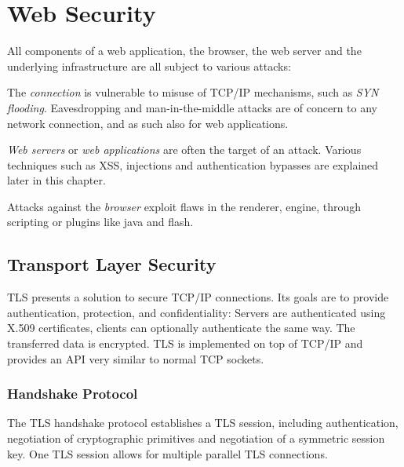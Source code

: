 \chapter{Web Security}
All components of a web application, the browser, the web server and the
underlying infrastructure are all subject to various attacks:

The \emph{connection} is vulnerable to misuse of TCP/IP mechanisms, such as
\textit{SYN flooding}. Eavesdropping and man-in-the-middle attacks are of
concern to any network connection, and as such also for web applications.

\emph{Web servers} or \emph{web applications} are often the target of an attack.
Various techniques such as XSS, injections and authentication bypasses are
explained later in this chapter.

Attacks against the \emph{browser} exploit flaws in the renderer, engine,
through scripting or plugins like java and flash.

\section{Transport Layer Security}
TLS presents a solution to secure TCP/IP connections. Its goals are to provide
authentication, protection, and confidentiality: Servers are authenticated using
X.509 certificates, clients can optionally authenticate the same way. The
transferred data is encrypted. TLS is implemented on top of TCP/IP and provides
an API very similar to normal TCP sockets.

\subsection{Handshake Protocol}
The TLS handshake protocol establishes a TLS session, including authentication,
negotiation of cryptographic primitives and negotiation of a symmetric session
key. One TLS session allows for multiple parallel TLS connections.

